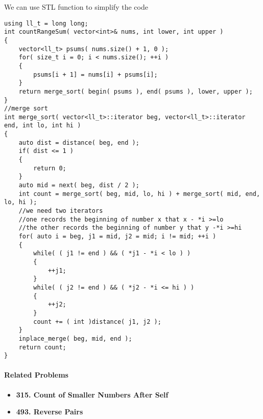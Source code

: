 We can use STL function  to simplify the code

\begin{lstlisting}[style=customc, caption={STL Merge Sort}]
using ll_t = long long;
int countRangeSum( vector<int>& nums, int lower, int upper )
{
    vector<ll_t> psums( nums.size() + 1, 0 );
    for( size_t i = 0; i < nums.size(); ++i )
    {
        psums[i + 1] = nums[i] + psums[i];
    }
    return merge_sort( begin( psums ), end( psums ), lower, upper );
}
//merge sort
int merge_sort( vector<ll_t>::iterator beg, vector<ll_t>::iterator end, int lo, int hi )
{
    auto dist = distance( beg, end );
    if( dist <= 1 )
    {
        return 0;
    }
    auto mid = next( beg, dist / 2 );
    int count = merge_sort( beg, mid, lo, hi ) + merge_sort( mid, end, lo, hi );
    //we need two iterators
    //one records the beginning of number x that x - *i >=lo
    //the other records the beginning of number y that y -*i >=hi
    for( auto i = beg, j1 = mid, j2 = mid; i != mid; ++i )
    {
        while( ( j1 != end ) && ( *j1 - *i < lo ) )
        {
            ++j1;
        }
        while( ( j2 != end ) && ( *j2 - *i <= hi ) )
        {
            ++j2;
        }
        count += ( int )distance( j1, j2 );
    }
    inplace_merge( beg, mid, end );
    return count;
}
\end{lstlisting}


\paragraph{Related Problems}
\begin{itemize}
\item \textbf{315. Count of Smaller Numbers After Self}
\item \textbf{493. Reverse Pairs}
\end{itemize}